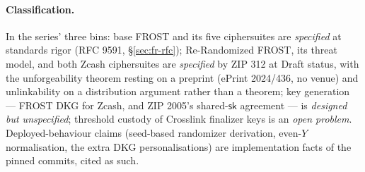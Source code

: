 \documentclass[11pt,a4paper]{article}
\theoremstyle{definition}
\newcommand{\F}{\mathbb{F}}
\newcommand{\rk}{\mathsf{rk}}
\newcommand{\Pallas}{\ensuremath{\mathsf{Pallas}}}
\newcommand{\Vesta}{\ensuremath{\mathsf{Vesta}}}
\newcommand{\ask}{\ensuremath{\mathsf{ask}}}
\newcommand{\aksym}{\ensuremath{\mathsf{ak}}}
\newcommand{\nksym}{\ensuremath{\mathsf{nk}}}
\begin{document}
\paragraph{Classification.} In the series' three bins: base FROST and
its five ciphersuites are \emph{specified} at standards rigor (RFC 9591,
\S\ref{sec:fr-rfc}); Re-Randomized FROST, its threat model, and both
Zcash ciphersuites are \emph{specified} by ZIP 312 at Draft status, with
the unforgeability theorem resting on a preprint (ePrint 2024/436, no
venue) and unlinkability on a distribution argument rather than a
theorem; key generation --- FROST DKG for Zcash, and ZIP 2005's
shared-$\mathsf{sk}$ agreement --- is \emph{designed but unspecified};
threshold custody of Crosslink finalizer keys is an \emph{open problem}.
Deployed-behaviour claims (seed-based randomizer derivation, even-$Y$
normalisation, the extra DKG personalisations) are implementation facts
of the pinned commits, cited as such.

\end{document}
